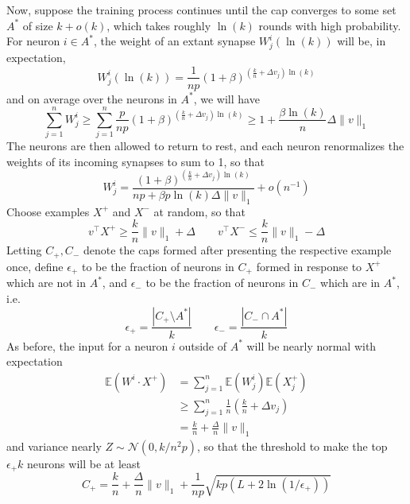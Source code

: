 \documentclass[final,12pt]{colt2022} %
\newcommand{\E}{\mathbb{E}}
\newcommand{\assmcore}[1]{{#1}^*}
\begin{document}
Now, suppose the training process continues until the cap converges to some set $\assmcore{A}$ of size $k + o(k)$, which takes roughly $\ln(k)$ rounds with high probability. For neuron $i \in \assmcore{A}$, the weight of an extant synapse $W_j^i(\ln(k))$ will be, in expectation, \[W_j^i(\ln(k)) = \frac{1}{np}(1 + \beta)^{\left(\frac{k}{n} + \Delta v_j\right) \ln(k)}\] and on average over the neurons in $\assmcore{A}$, we will have \[\sum_{j=1}^n W_j^i \ge \sum_{j=1}^n \frac{p}{np}(1 + \beta)^{\left(\frac{k}{n} + \Delta v_j\right) \ln(k)} \ge 1 + \frac{\beta \ln(k)}{n} \Delta \|v\|_1 \] The neurons are then allowed to return to rest, and each neuron renormalizes the weights of its incoming synapses to sum to 1, so that \[W_j^i = \frac{(1 + \beta)^{\left(\frac{k}{n} + \Delta v_j\right) \ln(k)}}{np + \beta p \ln(k) \Delta \|v\|_1} + o(n^{-1})\]
Choose examples $X^+$ and $X^-$ at random, so that \[v^\top X^+ \ge \frac{k}{n} \|v\|_1 + \Delta \quad\quad v^\top X^- \le \frac{k}{n} \|v\|_1 - \Delta\] Letting $C_+, C_-$ denote the caps formed after presenting the respective example once, define $\epsilon_+$ to be the fraction of neurons in $C_+$ formed in response to $X^+$ which are not in $\assmcore{A}$, and $\epsilon_-$ to be the fraction of neurons in $C_-$ which are in $\assmcore{A}$, i.e. \[\epsilon_+ = \frac{|C_+ \setminus \assmcore{A}|}{k} \quad\quad \epsilon_- = \frac{|C_- \cap \assmcore{A}|}{k}\]
As before, the input for a neuron $i$ outside of $\assmcore{A}$ will be nearly normal with expectation
\begin{align*}
    \E(W^i \cdot X^+) &= \sum_{j=1}^n \E(W_j^i) \E(X_j^+)\\
    &\ge \sum_{j=1}^n \frac{1}{n} \left( \frac{k}{n} + \Delta v_j \right)\\
    &= \frac{k}{n} + \frac{\Delta}{n} \|v\|_1
\end{align*} and variance nearly $Z \sim \mathcal N(0, k/n^2p)$, so that the threshold to make the top $\epsilon_+ k$ neurons will be at least \[C_+ = \frac{k}{n} + \frac{\Delta}{n} \|v\|_1 + \frac{1}{np} \sqrt{kp(L + 2\ln(1/\epsilon_+))}\]
\end{document}
